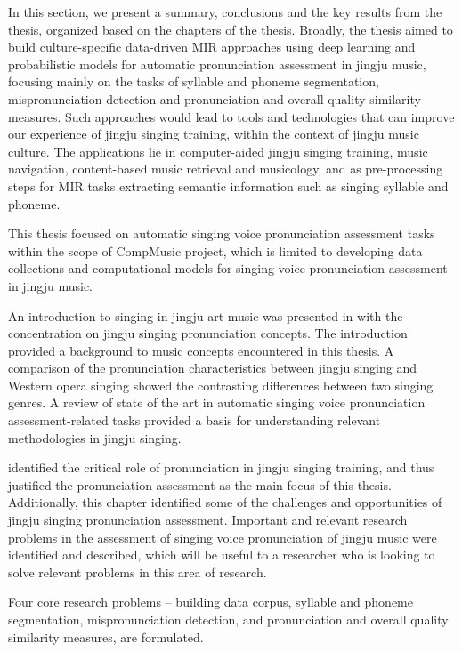 In this section, we present a summary, conclusions and the key results from the thesis, organized based on the chapters of the thesis. Broadly, the thesis aimed to build culture-specific data-driven \gls{MIR} approaches using deep learning and probabilistic models for automatic pronunciation assessment in jingju music, focusing mainly on the tasks of syllable and phoneme segmentation, mispronunciation detection and pronunciation and overall quality similarity measures. Such approaches would lead to tools and technologies that can improve our experience of jingju singing training, within the context of jingju music culture. The applications lie in computer-aided jingju singing training, music navigation, content-based music retrieval and musicology, and as pre-processing steps for \gls{MIR} tasks extracting semantic information such as singing syllable and phoneme.

This thesis focused on automatic singing voice pronunciation assessment tasks within the scope of CompMusic project, which is limited to developing data collections and computational models for singing voice pronunciation assessment in jingju music.

An introduction to singing in jingju art music was presented in  with the concentration on jingju singing pronunciation concepts. The introduction provided a background to music concepts encountered in this thesis. A comparison of the pronunciation characteristics between jingju singing and Western opera singing showed the contrasting differences between two singing genres. A review of state of the art in automatic singing voice pronunciation assessment-related tasks provided a basis for understanding relevant methodologies in jingju singing.

 identified the critical role of pronunciation in jingju singing training, and thus justified the pronunciation assessment as the main focus of this thesis. Additionally, this chapter identified some of the challenges and opportunities of jingju singing pronunciation assessment. Important and relevant research problems in the assessment of singing voice pronunciation of jingju music were identified and described, which will be useful to a researcher who is looking to solve relevant problems in this area of research.

Four core research problems -- building data corpus, syllable and phoneme segmentation, mispronunciation detection, and pronunciation and overall quality similarity measures, are formulated.

